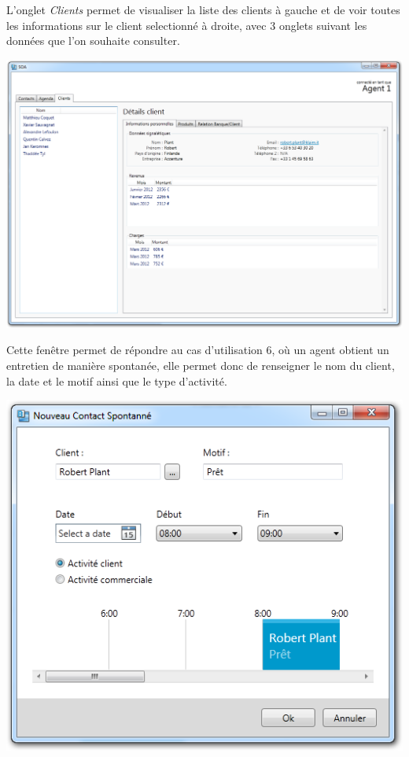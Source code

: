 L'onglet \textit{Clients} permet de visualiser la liste des clients à gauche et de voir toutes les informations sur le client selectionné à droite, avec 3 onglets suivant les données que l'on souhaite consulter.
\medskip
\begin {center}
\includegraphics[width=\textwidth]{../../ihm/pngIHM/ListeClients.png}
\end {center}
\medskip


Cette fenêtre permet de répondre au cas d'utilisation 6, où un agent obtient un entretien de manière spontanée, elle permet donc de renseigner le nom du client, la date et le motif ainsi que le type d'activité.
\medskip
\begin {center}
\includegraphics[width=\textwidth]{../../ihm/pngIHM/NouveauContactSpontanne.png}
\end {center}
\medskip


